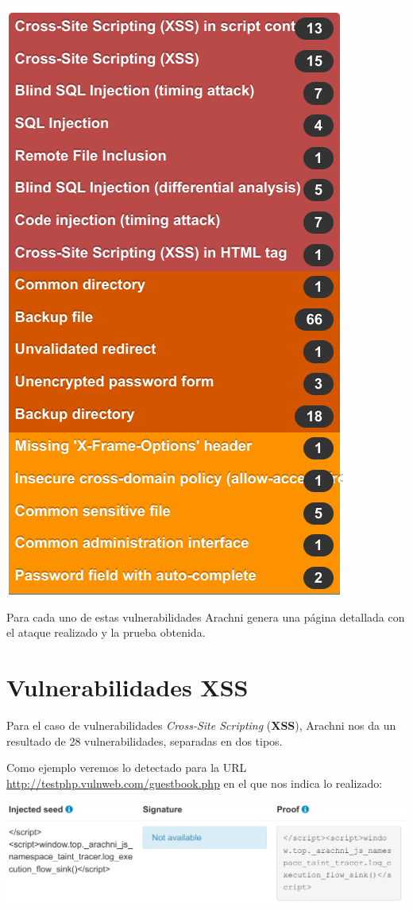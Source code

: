 \documentclass{\ClassPath/viu-tfm-template}
\begin{document}
\begin{center}
    \includegraphics[width=0.5\linewidth]{img/lista.png}
\end{center}
\vspace{-20pt}

Para cada uno de estas vulnerabilidades Arachni genera una página detallada con el ataque realizado y la prueba obtenida.


\chapter{Vulnerabilidades XSS}
Para el caso de vulnerabilidades \textit{Cross-Site Scripting} (\textbf{XSS}), Arachni nos da un resultado de 28 vulnerabilidades, separadas en dos tipos.

Como ejemplo veremos lo detectado para la URL \href{http://testphp.vulnweb.com/guestbook.php}{http://testphp.vulnweb.com/guestbook.php} en el que nos indica lo realizado:

\begin{center}
    \vspace{-20pt}
    \includegraphics[frame,width=0.9\linewidth]{img/informe_xss.png}
\end{center}
\end{document}
